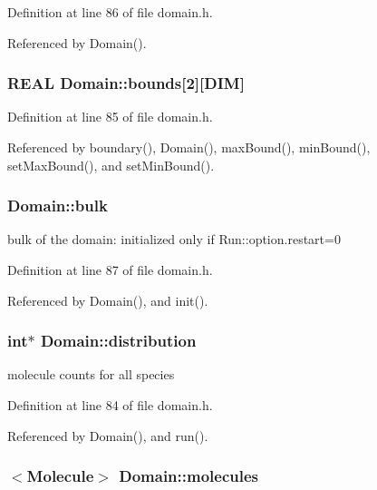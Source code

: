 Definition at line 86 of file domain.h.

Referenced by Domain().\hypertarget{classDomain_a7d71bbeda0ebb856c37e8deef6db9b2}{
\subsubsection[{bounds}]{\setlength{\rightskip}{0pt plus 5cm}REAL {\bf Domain::bounds}\mbox{[}2\mbox{]}\mbox{[}DIM\mbox{]}}}
\label{classDomain_a7d71bbeda0ebb856c37e8deef6db9b2}




Definition at line 85 of file domain.h.

Referenced by boundary(), Domain(), maxBound(), minBound(), setMaxBound(), and setMinBound().\hypertarget{classDomain_fbf03c1d162803247825d76ab12b8f36}{
\subsubsection[{bulk}]{ {\bf Domain::bulk}}}
\label{classDomain_fbf03c1d162803247825d76ab12b8f36}


bulk of the domain: initialized only if Run::option.restart=0 



Definition at line 87 of file domain.h.

Referenced by Domain(), and init().\hypertarget{classDomain_a5fcd6dd2bde60ea042f2556862d532d}{
\subsubsection[{distribution}]{\setlength{\rightskip}{0pt plus 5cm}int$\ast$ {\bf Domain::distribution}}}
\label{classDomain_a5fcd6dd2bde60ea042f2556862d532d}


molecule counts for all species 



Definition at line 84 of file domain.h.

Referenced by Domain(), and run().\hypertarget{classDomain_a685b2d61313732d3f787186f900bac0}{
\subsubsection[{molecules}]{$<${\bf Molecule}$>$ {\bf Domain::molecules}}}
\label{classDomain_a685b2d61313732d3f787186f900bac0}


